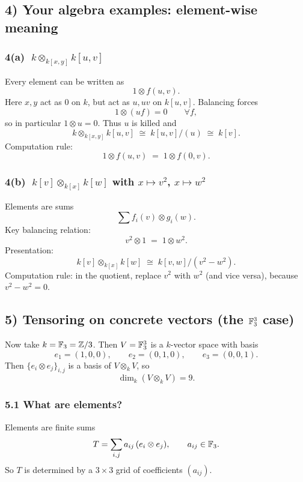 \documentclass[12pt,a4paper]{article}
\theoremstyle{plain}
\theoremstyle{definition}      %
\begin{document}
	\subsection*{4) Your algebra examples: element-wise meaning}
	
	\subsubsection*{4(a) \(\;k\otimes_{k[x,y]}k[u,v]\)}
	
	Every element can be written as
	\[
	1\otimes f(u,v).
	\]
	Here \(x,y\) act as \(0\) on \(k\), but act as \(u,uv\) on \(k[u,v]\).
	Balancing forces
	\[
	1\otimes (u f)=0\qquad \forall f,
	\]
	so in particular \(1\otimes u=0\).
	Thus \(u\) is killed and
	\[
	k\otimes_{k[x,y]}k[u,v]
	\;\cong\; k[u,v]/(u)
	\;\cong\; k[v].
	\]
	Computation rule:
	\[
	1\otimes f(u,v) \;=\; 1\otimes f(0,v).
	\]
	
	\subsubsection*{4(b) \(\;k[v]\otimes_{k[x]}k[w]\) with \(x\mapsto v^2\), \(x\mapsto w^2\)}
	
	Elements are sums
	\[
	\sum f_i(v)\otimes g_i(w).
	\]
	Key balancing relation:
	\[
	v^2\otimes 1 \;=\; 1\otimes w^2.
	\]
	Presentation:
	\[
	k[v]\otimes_{k[x]}k[w]
	\;\cong\; k[v,w]/(v^2-w^2).
	\]
	Computation rule: in the quotient, replace \(v^2\) with \(w^2\) (and vice versa), because \(v^2-w^2=0\).
	
	\subsection*{5) Tensoring on concrete vectors (the \(\Bbb F_3^3\) case)}
	
	Now take \(k=\Bbb F_3=\Bbb Z/3\).
	Then \(V=\Bbb F_3^3\) is a \(k\)-vector space with basis
	\[
	e_1=(1,0,0),\qquad e_2=(0,1,0),\qquad e_3=(0,0,1).
	\]
	Then \(\{e_i\otimes e_j\}_{i,j}\) is a basis of \(V\otimes_k V\), so
	\[
	\dim_k(V\otimes_k V)=9.
	\]
	
	\subsubsection*{5.1 What are elements?}
	
	Elements are finite sums
	\[
	T=\sum_{i,j} a_{ij}\,(e_i\otimes e_j),
	\qquad a_{ij}\in \Bbb F_3.
	\]
	So \(T\) is determined by a \(3\times 3\) grid of coefficients \((a_{ij})\).
	
\end{document}
